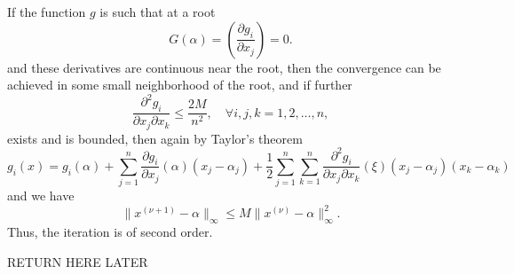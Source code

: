 \documentclass[../main.tex]{subfiles}
\begin{document}
If the function $g$ is such that at a root
\begin{equation*}
	G(\alpha) = \left( \frac{\partial g_i}{\partial x_j} \right) = 0.
\end{equation*}
and these derivatives are continuous near the root, then the convergence can be achieved in some small neighborhood of the root, and if further
\begin{equation}
	\frac{\partial ^2 g_i}{\partial x_j \partial x_k} \leq \frac{2 M}{n^2}, \quad \forall i, j, k = 1, 2, \dots, n,
\end{equation}
exists and is bounded, then again by Taylor's theorem
\begin{equation*}
	g_i(x) = g_i(\alpha) + \sum_{j=1}^n \frac{\partial g_i}{\partial x_j} (\alpha) (x_j - \alpha_j) + \frac{1}{2} \sum_{j=1}^n \sum_{k=1}^n \frac{\partial^2 g_i}{\partial x_j \partial x_k} (\xi) (x_j - \alpha_j)(x_k - \alpha_k)
\end{equation*}
and we have
\begin{equation}
	\| x^{(\nu+1)} - \alpha \|_\infty \leq M \| x^{(\nu)} - \alpha \|_\infty^2.
\end{equation}
Thus, the iteration is of second order.

RETURN HERE LATER
\end{document}
